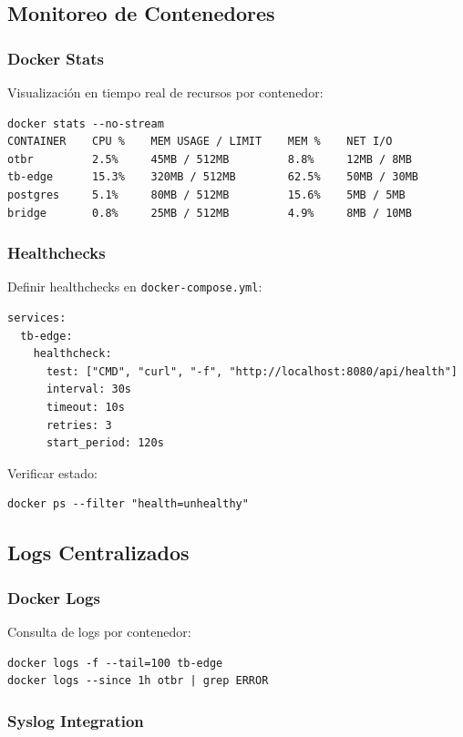 \subsection{Monitoreo de Contenedores}

\subsubsection{Docker Stats}

Visualización en tiempo real de recursos por contenedor:
\begin{verbatim}
docker stats --no-stream
CONTAINER    CPU %    MEM USAGE / LIMIT    MEM %    NET I/O
otbr         2.5%     45MB / 512MB         8.8%     12MB / 8MB
tb-edge      15.3%    320MB / 512MB        62.5%    50MB / 30MB
postgres     5.1%     80MB / 512MB         15.6%    5MB / 5MB
bridge       0.8%     25MB / 512MB         4.9%     8MB / 10MB
\end{verbatim}

\subsubsection{Healthchecks}

Definir healthchecks en \texttt{docker-compose.yml}:
\begin{verbatim}
services:
  tb-edge:
    healthcheck:
      test: ["CMD", "curl", "-f", "http://localhost:8080/api/health"]
      interval: 30s
      timeout: 10s
      retries: 3
      start_period: 120s
\end{verbatim}

Verificar estado:
\begin{verbatim}
docker ps --filter "health=unhealthy"
\end{verbatim}

\subsection{Logs Centralizados}

\subsubsection{Docker Logs}

Consulta de logs por contenedor:
\begin{verbatim}
docker logs -f --tail=100 tb-edge
docker logs --since 1h otbr | grep ERROR
\end{verbatim}

\subsubsection{Syslog Integration}

